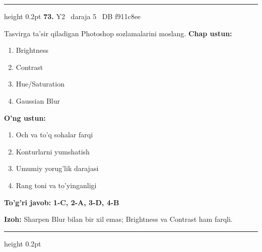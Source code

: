 \documentclass[10pt,a4paper,oneside]{article}
\begin{document}
\vspace{2mm}\hrule height 0.2pt \vspace{4mm}
\hypertarget{q73}{\textbf{\color{ink}73.}}  {\color{muted}\scriptsize Y2 \textbullet\ daraja 5 \textbullet\ DB f911c8ee}
\par
Tasvirga ta'sir qiladigan Photoshop sozlamalarini moslang.
\textbf{\footnotesize Chap ustun:}
\begin{enumerate}[label=\arabic*),leftmargin=9mm]
\item Brightness
\item Contrast
\item Hue/Saturation
\item Gaussian Blur
\end{enumerate}
\textbf{\footnotesize O'ng ustun:}
\begin{enumerate}[label=\Alph*),leftmargin=9mm]
\item Och va to'q sohalar farqi
\item Konturlarni yumshatish
\item Umumiy yorug'lik darajasi
\item Rang toni va to'yinganligi
\end{enumerate}
\begin{tcolorbox}[enhanced,breakable,colback=teal!4,colframe=teal!45!black,boxrule=0.45pt,arc=1.2mm,left=2.8mm,right=2.8mm,top=2mm,bottom=2mm,before skip=2mm,after skip=2mm]
\textbf{\color{teal}To'g'ri javob:} \textbf{1-C, 2-A, 3-D, 4-B}
\par\smallskip
\textbf{Izoh:} Sharpen Blur bilan bir xil emas; Brightness va Contrast ham farqli.
\end{tcolorbox}
\vspace{2mm}\hrule height 0.2pt \vspace{4mm}
\end{document}
